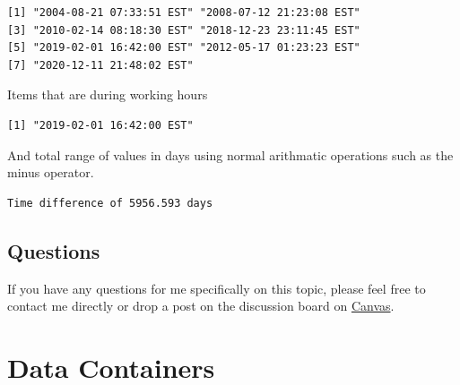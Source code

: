 \documentclass[
  letterpaper,
]{book}
\newenvironment{Shaded}{\begin{snugshade}}{\end{snugshade}}
\newcommand{\DecValTok}[1]{\textcolor[rgb]{0.68,0.00,0.00}{#1}}
\newcommand{\FunctionTok}[1]{\textcolor[rgb]{0.28,0.35,0.67}{#1}}
\newcommand{\NormalTok}[1]{\textcolor[rgb]{0.00,0.23,0.31}{#1}}
\newcommand{\OtherTok}[1]{\textcolor[rgb]{0.00,0.23,0.31}{#1}}
\newcommand{\SpecialCharTok}[1]{\textcolor[rgb]{0.37,0.37,0.37}{#1}}
\begin{document}
\begin{verbatim}
[1] "2004-08-21 07:33:51 EST" "2008-07-12 21:23:08 EST"
[3] "2010-02-14 08:18:30 EST" "2018-12-23 23:11:45 EST"
[5] "2019-02-01 16:42:00 EST" "2012-05-17 01:23:23 EST"
[7] "2020-12-11 21:48:02 EST"
\end{verbatim}

Items that are during working hours

\begin{Shaded}
\end{Shaded}

\begin{verbatim}
[1] "2019-02-01 16:42:00 EST"
\end{verbatim}

And total range of values in days using normal arithmatic operations
such as the minus operator.

\begin{Shaded}
\end{Shaded}

\begin{verbatim}
Time difference of 5956.593 days
\end{verbatim}

\section{Questions}\label{questions}

If you have any questions for me specifically on this topic, please feel
free to contact me directly or drop a post on the discussion board on
\href{https://canvas.vcu.edu}{Canvas}.

\chapter{Data Containers}\label{data-containers}
\end{document}
